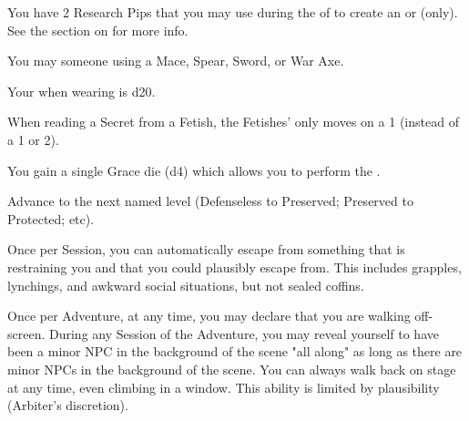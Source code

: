 \begin{multicols*}{2}

You have 2 Research Pips that you may use during the  of  to create an  or  (only). See the section on  for more info.


You may  someone using a Mace, Spear, Sword, or War Axe.

\newpage


Your \MD when wearing  is d20.


When reading a Secret from a Fetish, the Fetishes' \UD only moves \DCDOWN on a 1 (instead of a 1 or 2).


You gain a single Grace die (d4) which allows you to perform the .


Advance   to the next named level (Defenseless to Preserved; Preserved to Protected; etc).

\cbreak


Once per Session, you can automatically escape from something that is restraining you and that you could plausibly escape from. This includes grapples, lynchings, and awkward social situations, but not sealed coffins.


Once per Adventure, at any time, you may declare that you are walking off-screen. During any Session of the Adventure, you may reveal yourself to have been a minor NPC in the background of the scene "all along" as long as there are minor NPCs in the background of the scene. You can always walk back on stage at any time, even climbing in a window. This ability is limited by plausibility (Arbiter's discretion). 


\end{multicols*}
